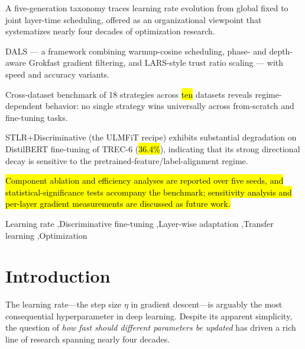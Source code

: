 \documentclass[a4paper,fleqn]{cas-dc}
\begin{document}
\begin{highlights}
\item A five-generation taxonomy traces learning rate evolution from global fixed to joint layer-time scheduling, offered as an organizational viewpoint that systematizes nearly four decades of optimization research.
\item DALS --- a framework combining warmup-cosine scheduling, phase- and depth-aware Grokfast gradient filtering, and LARS-style trust ratio scaling --- with speed and accuracy variants.
\item Cross-dataset benchmark of 18 strategies across \hl{ten} datasets reveals regime-dependent behavior: no single strategy wins universally across from-scratch and fine-tuning tasks.
\item STLR+Discriminative (the ULMFiT recipe) exhibits substantial degradation on DistilBERT fine-tuning of TREC-6 (\hl{36.4\%}), indicating that its strong directional decay is sensitive to the pretrained-feature/label-alignment regime.
\item \hl{Component ablation and efficiency analyses are reported over five seeds, and statistical-significance tests accompany the benchmark; sensitivity analysis and per-layer gradient measurements are discussed as future work.}
\end{highlights}

\begin{keywords}
Learning rate \sep Discriminative fine-tuning \sep Layer-wise adaptation \sep Transfer learning \sep Optimization
\end{keywords}

\maketitle

\section{Introduction}\label{sec:intro}

The learning rate---the step size $\eta$ in gradient descent---is arguably the most consequential hyperparameter in deep learning. Despite its apparent simplicity, the question of \emph{how fast should different parameters be updated} has driven a rich line of research spanning nearly four decades.
\end{document}
